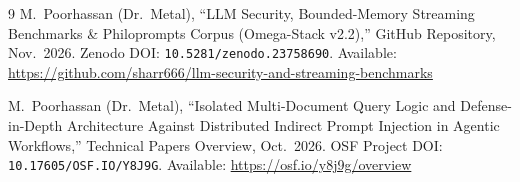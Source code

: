 \documentclass[11pt,a4paper]{article}
\begin{document}
\begin{thebibliography}{9}
M.~Poorhassan (Dr.\ Metal),
``LLM Security, Bounded-Memory Streaming Benchmarks \& Philoprompts Corpus (Omega-Stack v2.2),''
GitHub Repository, Nov.\ 2026.
Zenodo DOI: \texttt{10.5281/zenodo.23758690}.
Available: \url{https://github.com/sharr666/llm-security-and-streaming-benchmarks}

M.~Poorhassan (Dr.\ Metal),
``Isolated Multi-Document Query Logic and Defense-in-Depth Architecture Against Distributed Indirect Prompt Injection in Agentic Workflows,''
Technical Papers Overview, Oct.\ 2026.
OSF Project DOI: \texttt{10.17605/OSF.IO/Y8J9G}.
Available: \url{https://osf.io/y8j9g/overview}

\end{thebibliography}
\end{document}
